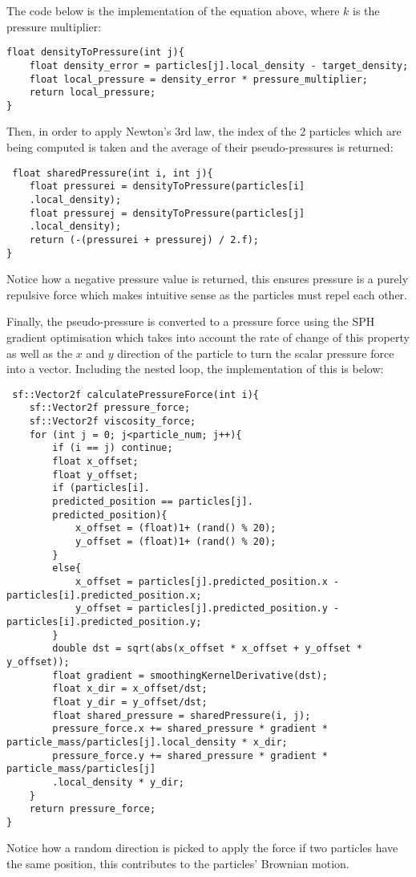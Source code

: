 \documentclass[write-up.tex]{subfiles}
\begin{document}
The code below is the implementation of the equation above, where $k$ is the pressure multiplier:
\begin{lstlisting}
float densityToPressure(int j){
    float density_error = particles[j].local_density - target_density;
    float local_pressure = density_error * pressure_multiplier;
    return local_pressure;
}
\end{lstlisting}

Then, in order to apply Newton's 3rd law, the index of the 2 particles which are being computed is taken and the average of their pseudo-pressures is returned:

\begin{lstlisting}
 float sharedPressure(int i, int j){
    float pressurei = densityToPressure(particles[i]
    .local_density);
    float pressurej = densityToPressure(particles[j]
    .local_density);
    return (-(pressurei + pressurej) / 2.f);
}
\end{lstlisting}
Notice how a negative pressure value is returned, this ensures pressure is a purely repulsive force which makes intuitive sense as the particles must repel each other.

Finally, the pseudo-pressure is converted to a pressure force using the SPH gradient optimisation which takes into account the rate of change of this property as well as the $x$ and $y$ direction of the particle to turn the scalar pressure force into a vector. Including the nested loop, the implementation of this is below:

\begin{lstlisting}
 sf::Vector2f calculatePressureForce(int i){
    sf::Vector2f pressure_force;
    sf::Vector2f viscosity_force;
    for (int j = 0; j<particle_num; j++){
        if (i == j) continue;
        float x_offset;
        float y_offset;
        if (particles[i].
        predicted_position == particles[j].
        predicted_position){
            x_offset = (float)1+ (rand() % 20);
            y_offset = (float)1+ (rand() % 20);
        }
        else{
            x_offset = particles[j].predicted_position.x - particles[i].predicted_position.x;
            y_offset = particles[j].predicted_position.y - particles[i].predicted_position.y;
        }
        double dst = sqrt(abs(x_offset * x_offset + y_offset * y_offset));
        float gradient = smoothingKernelDerivative(dst);
        float x_dir = x_offset/dst;
        float y_dir = y_offset/dst;
        float shared_pressure = sharedPressure(i, j);
        pressure_force.x += shared_pressure * gradient * particle_mass/particles[j].local_density * x_dir;
        pressure_force.y += shared_pressure * gradient * particle_mass/particles[j]
        .local_density * y_dir;
    }
    return pressure_force;
}
\end{lstlisting}
Notice how a random direction is picked to apply the force if two particles have the same position, this contributes to the particles' Brownian motion.
\end{document}
